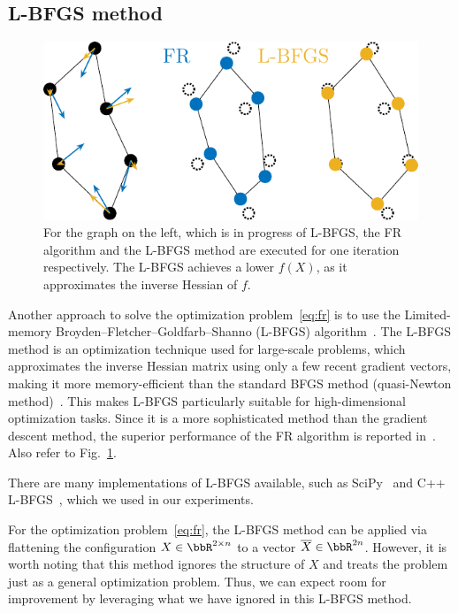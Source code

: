 \documentclass[dvipdfmx,lettersize,journal]{IEEEtran}
\begin{document}
\subsection{L-BFGS method}\label{ssec:lbfgs}

\begin{figure}[t]
  \centering
  \includegraphics[width=0.804\columnwidth]{comparison/comparison_FRandLBFGS.pdf}
  \caption{
    For the graph on the left, which is in progress of L-BFGS, the FR algorithm and the L-BFGS method are executed for one iteration respectively.
    The L-BFGS achieves a lower $f(X)$, as it approximates the inverse Hessian of $f$.
  }
  \label{fig:comparisonFRandLBFGS}
\end{figure}

Another approach to solve the optimization problem~\eqref{eq:fr} is to use the Limited-memory Broyden--Fletcher--Goldfarb--Shanno (L-BFGS) algorithm~\cite{6183577}.
The L-BFGS method is an optimization technique used for large-scale problems, which approximates the inverse Hessian matrix using only a few recent gradient vectors, making it more memory-efficient than the standard BFGS method (quasi-Newton method)~\cite{liuLimitedMemoryBFGS1989}.
This makes L-BFGS particularly suitable for high-dimensional optimization tasks. Since it is a more sophisticated method than the gradient descent method, the superior performance of the FR algorithm is reported in~\cite{6183577}. Also refer to Fig.~\ref{fig:comparisonFRandLBFGS}.

There are many implementations of L-BFGS available, such as SciPy~\cite{2020SciPy-NMeth} and C++ L-BFGS~\cite{qiuYixuanLBFGSpp2024,okazakiChokkanLiblbfgs2024}, which we used in our experiments.

For the optimization problem~\eqref{eq:fr}, the L-BFGS method can be applied via flattening the configuration $X \in \bbR^{2 \times n}$ to a vector $\overline{X} \in \bbR^{2n}$.
However, it is worth noting that this method ignores the structure of $X$ and treats the problem just as a general optimization problem.
Thus, we can expect room for improvement by leveraging what we have ignored in this L-BFGS method.
\end{document}

